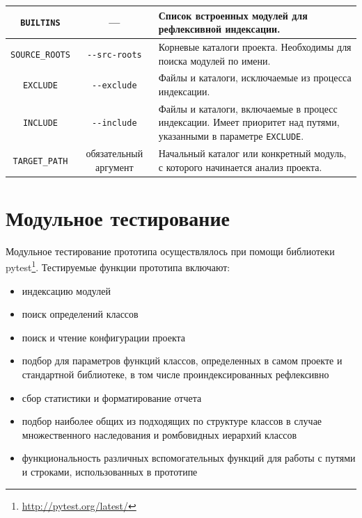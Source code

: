 \begin{center}
\begin{scriptsize}
\begin{longtable}{|c|c|p{4cm}|}
  \texttt{BUILTINS} & --- & Список встроенных модулей для рефлексивной
  индексации.
  \\ \hline

  \texttt{SOURCE\_ROOTS} & \texttt{-{}-src-roots} & Корневые каталоги проекта.
  Необходимы для поиска модулей по имени.  
  \\ \hline

  \texttt{EXCLUDE} & \texttt{-{}-exclude} & Файлы и каталоги, исключаемые из
  процесса индексации.
  \\ \hline

  \texttt{INCLUDE} & \texttt{-{}-include} & Файлы и каталоги, включаемые в
  процесс индексации. Имеет приоритет над путями, указанными в параметре
  \texttt{EXCLUDE}.
  \\ \hline

  \texttt{TARGET\_PATH} & обязательный аргумент & Начальный каталог или
  конкретный модуль, с которого начинается анализ проекта.
  \\ \hline

\end{longtable}
\end{scriptsize}
\end{center}

\section{Модульное тестирование}
\label{sec:unit-testing}

Модульное тестирование прототипа осуществлялось при помощи библиотеки
pytest\footnote{\url{http://pytest.org/latest/}}. Тестируемые функции прототипа
включают:

\begin{itemize}
    \item индексацию модулей
    \item поиск определений классов
    \item поиск и чтение конфигурации проекта
    \item подбор для параметров функций классов, определенных в самом проекте и
      стандартной библиотеке, в том числе проиндексированных рефлексивно
    \item сбор статистики и форматирование отчета
    \item подбор наиболее общих из подходящих по структуре классов в случае
      множественного наследования и ромбовидных иерархий классов
    \item функциональность различных вспомогательных функций для работы с
      путями и строками, использованных в прототипе
\end{itemize}

